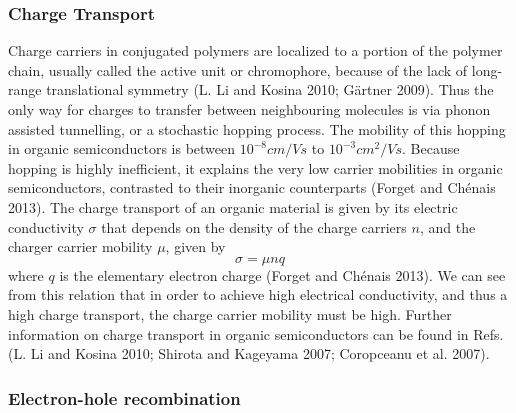 \documentclass[
  letterpaper,
  DIV=11,
  numbers=noendperiod,
  oneside]{scrreprt}
\begin{document}
\hypertarget{charge-transport}{%
\subsubsection{Charge Transport}\label{charge-transport}}

Charge carriers in conjugated polymers are localized to a portion of the
polymer chain, usually called the active unit or chromophore, because of
the lack of long-range translational symmetry (L. Li and Kosina 2010;
Gärtner 2009). Thus the only way for charges to transfer between
neighbouring molecules is via phonon assisted tunnelling, or a
stochastic hopping process. The mobility of this hopping in organic
semiconductors is between \(10^{-8} cm/Vs\) to \(10^{-3} cm^2/Vs\).
Because hopping is highly inefficient, it explains the very low carrier
mobilities in organic semiconductors, contrasted to their inorganic
counterparts (Forget and Chénais 2013). The charge transport of an
organic material is given by its electric conductivity \(\sigma\) that
depends on the density of the charge carriers \(n\), and the charger
carrier mobility \(\mu\), given by \[\sigma = \mu n q\]where \(q\) is
the elementary electron charge (Forget and Chénais 2013). We can see
from this relation that in order to achieve high electrical
conductivity, and thus a high charge transport, the charge carrier
mobility must be high. Further information on charge transport in
organic semiconductors can be found in Refs. (L. Li and Kosina 2010;
Shirota and Kageyama 2007; Coropceanu et al. 2007).

\hypertarget{electron-hole-recombination}{%
\subsubsection{Electron-hole
recombination}\label{electron-hole-recombination}}
\end{document}
